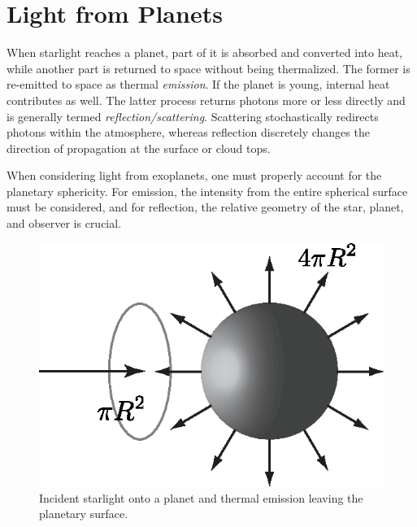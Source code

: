 \section{Light from Planets}

When starlight reaches a planet, part of it is absorbed and converted into heat, while another part is returned to space without being thermalized. The former is re-emitted to space as thermal \emph{emission}. If the planet is young, internal heat contributes as well. The latter process returns photons more or less directly and is generally termed \emph{reflection/scattering}. Scattering stochastically redirects photons within the atmosphere, whereas reflection discretely changes the direction of propagation at the surface or cloud tops.

When considering light from exoplanets, one must properly account for the planetary sphericity. For emission, the intensity from the entire spherical surface must be considered, and for reflection, the relative geometry of the star, planet, and observer is crucial.

\begin{figure}[h]
\begin{center}
	\includegraphics[width=\linewidth]{fig/io.eps}
\end{center}
\caption{Incident starlight onto a planet and thermal emission leaving the planetary surface.}
\label{fig:io}
\end{figure}

